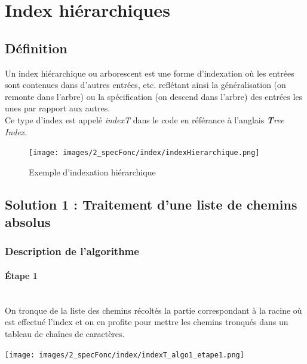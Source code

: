 \documentclass[./standalone.tex]{subfiles}
\begin{document}
\section{Index hiérarchiques}

\subsection{Définition}
Un index hiérarchique ou arborescent est une forme d'indexation où les entrées sont contenues dans d'autres entrées, etc. reflétant ainsi la généralisation (on remonte dans l'arbre) ou la spécification (on descend dans l'arbre) des entrées les unes par rapport aux autres.\\

Ce type d'index est appelé \textit{indexT} dans le code en référance à l'anglais \textit{\textbf{T}ree Index}.\\

\begin{figure}[h!]
    \centering
    \texttt{[image: images/2\_specFonc/index/indexHierarchique.png]}
    \caption{Exemple d'indexation hiérarchique}
    \label{fig:indexT}
\end{figure}

\newpage
\subsection{Solution 1 : Traitement d'une liste de chemins absolus}
\bigskip
\bigskip
\subsubsection{Description de l'algorithme}
\vspace{0.5cm}
\paragraph{Étape 1\\\\}
On tronque de la liste des chemins récoltés la partie correspondant à la racine où est effectué l'index et on en profite pour mettre les chemins tronqués dans un tableau de chaînes de caractères.\\

\begin{center}
\texttt{[image: images/2\_specFonc/index/indexT\_algo1\_etape1.png]}
\label{fig:indexT_algo1_etape1}
\end{center}
\end{document}
